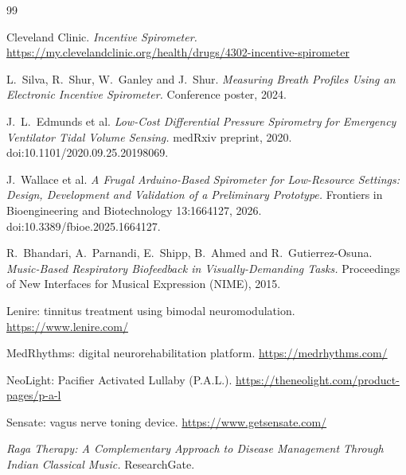 \documentclass[12pt,a4paper]{article}
\begin{document}
\begin{thebibliography}{99}
\footnotesize
\setlength{\itemsep}{0pt}

 Cleveland Clinic. \textit{Incentive Spirometer.} \url{https://my.clevelandclinic.org/health/drugs/4302-incentive-spirometer}

 L.~Silva, R.~Shur, W.~Ganley and J.~Shur. \textit{Measuring Breath Profiles Using an Electronic Incentive Spirometer.} Conference poster, 2024.

 J.~L.~Edmunds et al. \textit{Low-Cost Differential Pressure Spirometry for Emergency Ventilator Tidal Volume Sensing.} medRxiv preprint, 2020. doi:10.1101/2020.09.25.20198069.

 J.~Wallace et al. \textit{A Frugal Arduino-Based Spirometer for Low-Resource Settings: Design, Development and Validation of a Preliminary Prototype.} Frontiers in Bioengineering and Biotechnology 13:1664127, 2026. doi:10.3389/fbioe.2025.1664127.

 R.~Bhandari, A.~Parnandi, E.~Shipp, B.~Ahmed and R.~Gutierrez-Osuna. \textit{Music-Based Respiratory Biofeedback in Visually-Demanding Tasks.} Proceedings of New Interfaces for Musical Expression (NIME), 2015.

 Lenire: tinnitus treatment using bimodal neuromodulation. \url{https://www.lenire.com/}

 MedRhythms: digital neurorehabilitation platform. \url{https://medrhythms.com/}

 NeoLight: Pacifier Activated Lullaby (P.A.L.). \url{https://theneolight.com/product-pages/p-a-l}

 Sensate: vagus nerve toning device. \url{https://www.getsensate.com/}

 \textit{Raga Therapy: A Complementary Approach to Disease Management Through Indian Classical Music.} ResearchGate.

\end{thebibliography}
\end{document}
